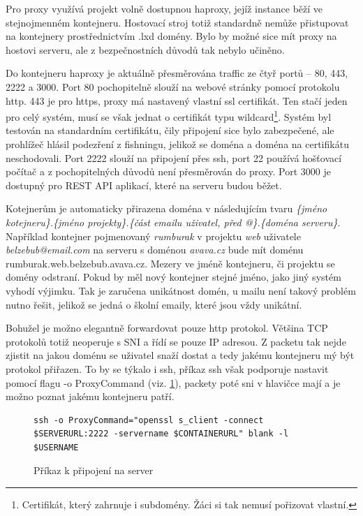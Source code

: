 \documentclass[a4paper,oneside,12pt]{report}
\begin{document}
Pro proxy využívá projekt volně dostupnou haproxy, jejíž instance běží ve stejnojmenném kontejneru.
Hostovací stroj totiž standardně nemůže přistupovat na kontejnery prostřednictvím .lxd domény.
Bylo by možné sice mít proxy na hostovi serveru, ale z bezpečnostních důvodů tak nebylo učiněno.

Do kontejneru haproxy je aktuálně přesměrována traffic ze čtyř portů -- 80, 443, 2222 a 3000.
Port 80 pochopitelně slouží na webové stránky pomocí protokolu http.
443 je pro https, proxy má nastavený vlastní ssl certifikát.
Ten stačí jeden pro celý systém, musí se však jednat o certifikát typu wildcard\footnote{Certifikát, který zahrnuje i subdomény. Žáci si tak nemusí pořizovat vlastní.}.
Systém byl testován na standardním certifikátu, čily připojení sice bylo zabezpečené, ale prohlížeč hlásil podezření z fishningu, jelikož se doména a doména na certifikátu neschodovali.
Port 2222 slouží na připojení přes ssh, port 22 používá hošťovací počítač a z pochopitelných důvodů není přesměrován do proxy.
Port 3000 je dostupný pro REST API aplikací, které na serveru budou běžet.

Kotejnerům je automaticky přirazena doména v následujícím tvaru \textit{\{jméno kotejneru\}.\{jméno projekty\}.\{část emailu uživatel, před @\}.\{doména serveru\}}.
Například kontejner pojmenovaný \textit{rumburak} v projektu \textit{web} uživatele \textit{belzebub@email.com} na serveru s doménou \textit{avava.cz} bude mít doménu {rumburak.web.belzebub.avava.cz}.
Mezery ve jméně kontejneru, či projektu se domény odstraní.
Pokud by měl nový kontejner stejné jméno, jako jiný systém vyhodí výjimku.
Tak je zaručena unikátnost domén, u mailu není takový problém nutno řešit, jelikož se jedná o školní emaily, které jsou vždy unikátní.

Bohužel je možno elegantně forwardovat pouze http protokol.
Většina TCP protokolů totiž neoperuje s SNI a řídí se pouze IP adresou.
Z packetu tak nejde zjistit na jakou doménu se uživatel snaží dostat a tedy jakému kontejneru mý být protokol přiřazen.
To by se týkalo i ssh, příkaz ssh však podporuje nastavit pomocí flagu -o ProxyCommand (viz. \ref{fig:sshcom}), packety poté sni v hlavičce mají a je možno poznat jakému kontejneru patří.
\begin{figure}[h]
\begin{lstlisting}[breaklines]
ssh -o ProxyCommand="openssl s_client -connect $SERVERURL:2222 -servername $CONTAINERURL" blank -l $USERNAME
\end{lstlisting}
\caption[Příkaz k připojení na server, vlastní tvorba]{Příkaz k připojení na server\protect\footnotemark}
\label{fig:sshcom}
\end{figure}
\end{document}
